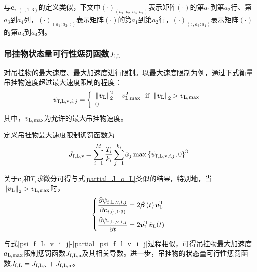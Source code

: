 与$\boldsymbol{c}_{i,(:,1:3)}$的定义类似，下文中$\left(\cdot\right)_{\left(a_1:a_2,a_3:a_4\right)}$表示矩阵$\left(\cdot\right)$的第$a_1$到第$a_2$行、第$a_3$到$a_4$列，$\left(\cdot\right)_{\left(a_1:a_2,:\right)}$表示矩阵$\left(\cdot\right)$的第$a_1$到第$a_2$行，$\left(\cdot\right)_{\left(:,a_3:a_4\right)}$表示矩阵$\left(\cdot\right)$的第$a_3$到$a_4$列。

\subsubsection{吊挂物状态量可行性惩罚函数$J_{\rm{f,L}}$}
对吊挂物的最大速度、最大加速度进行限制。以最大速度限制为例，通过下式衡量吊挂物速度超过最大速度限制的程度：
\begin{equation}\label{psi_f_L_v_i_j}
    \psi_{{\rm{f,L,v}},i,j} = \left\{\begin{array}{l}
        \left\|\boldsymbol{v}_{\rm{L}}\right\|^2_2 - v_{{\rm{L,max}}}^2 \,\,\,\, {\rm{if}} \,\, \left\|\boldsymbol{v}_{\rm{L}}\right\|_2 > v_{\rm{L},\max}\\
        0
    \end{array}
    \right.
\end{equation}
其中，$v_{\rm{L,max}}$为允许的最大吊挂物速度。

定义吊挂物最大速度限制惩罚函数为
\begin{equation}\label{J_f_L_v}
    J_{\rm{f,L,v}} =\sum\limits_{i=1}^M\frac{T_i}{k_i}\sum\limits_{j=1}^{k_i}{\Bar{\omega}_j\max\left\{\psi_{{\rm{f,L,v}},i,j},0\right\}^3}
\end{equation}

关于$\boldsymbol{c}_i$和$T_i$求微分可得与式\ref{partial_J_o_L}类似的结果，特别地，当$\left\|\boldsymbol{v}_{\rm{L}}\right\|_2 > v_{\rm{L},\max}$时，
\begin{equation}\label{partial_psi_f_l_v_i_j}
    \left\{\begin{aligned}
        \frac{\partial \psi_{{\rm{f,L,v}},i,j}}{\partial \boldsymbol{c}_{i,(:,1:3)}} &= 2\dot{\boldsymbol{\beta}}\left(t\right) \boldsymbol{v}_{\rm{L}}^{\rm{T}}\\
        \frac{\partial \psi_{{\rm{f,L,v}},i,j}}{\partial t} &= 2\boldsymbol{v}_{\rm{L}}^{\rm{T}}\dot{\boldsymbol{v}}_{\rm{L}}(t)
    \end{aligned}
    \right.
\end{equation}

与式\ref{psi_f_L_v_i_j}-\ref{partial_psi_f_l_v_i_j}过程相似，可得吊挂物最大加速度$a_{\rm{L,max}}$限制惩罚函数$J_{\rm{f,L,a}}$及其相关导数。进一步，吊挂物的状态量可行性惩罚函数$J_{\rm{f,L}} = J_{\rm{f,L,v}} + J_{\rm{f,L,a}}$。

